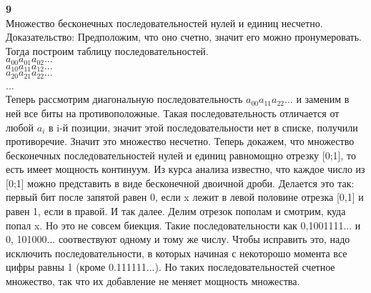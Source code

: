 \documentclass[12pt,a4paper]{scrartcl}
\newcommand{\task}[1]{
\large {\textbf{#1}}
}
\begin{document}
\task{9}\\
Множество бесконечных последовательностей нулей и единиц несчетно. Доказательство:
Предположим, что оно счетно, значит его можно пронумеровать. Тогда построим таблицу
последовательностей.\\
$a_{00} a_{01} a_{02} ...$\\
$a_{10} a_{11} a_{12} ...$\\
$a_{20} a_{21} a_{22} ...$\\
...\\
Теперь рассмотрим диагональную последовательность  $a_{00} a_{11} a_{22} ...$ и
заменим в ней все биты на противоположные. Такая последовательность отличается
от любой $a_{i}$ в i-й позиции, значит этой последовательности нет в списке,
получили противоречие. Значит это множество несчетно.
Теперь докажем, что множество бесконечных последовательностей нулей и единиц равномощно
отрезку [0;1], то есть имеет мощность континуум.
Из курса анализа известно, что каждое число из [0;1] можно представить в виде
бесконечной двоичной дроби. Делается это так: первый бит после запятой равен 0, если
x лежит в левой половине отрезка [0,1] и равен 1, если в правой. И так далее. Делим
отрезок пополам и смотрим, куда попал x. Но это не совсем биекция. Такие последовательности
как 0,1001111... и 0, 101000... соотвествуют одному и тому же числу. Чтобы исправить
это, надо исключить последовательности, в которых начиная с некоторошо момента все
цифры равны 1 (кроме 0.111111...). Но таких последовательностей счетное множество, так
что их добавление не меняет мощность множества.
\end{document}
